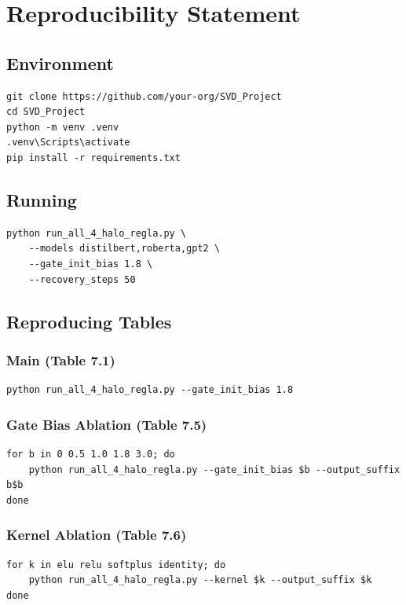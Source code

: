 
\section{Reproducibility Statement}

\subsection{Environment}

\begin{lstlisting}
git clone https://github.com/your-org/SVD_Project
cd SVD_Project
python -m venv .venv
.venv\Scripts\activate
pip install -r requirements.txt
\end{lstlisting}

\subsection{Running}

\begin{lstlisting}
python run_all_4_halo_regla.py \
    --models distilbert,roberta,gpt2 \
    --gate_init_bias 1.8 \
    --recovery_steps 50
\end{lstlisting}

\subsection{Reproducing Tables}

\subsubsection{Main (Table 7.1)}
\begin{lstlisting}
python run_all_4_halo_regla.py --gate_init_bias 1.8
\end{lstlisting}

\subsubsection{Gate Bias Ablation (Table 7.5)}
\begin{lstlisting}
for b in 0 0.5 1.0 1.8 3.0; do
    python run_all_4_halo_regla.py --gate_init_bias $b --output_suffix b$b
done
\end{lstlisting}

\subsubsection{Kernel Ablation (Table 7.6)}
\begin{lstlisting}
for k in elu relu softplus identity; do
    python run_all_4_halo_regla.py --kernel $k --output_suffix $k
done
\end{lstlisting}


